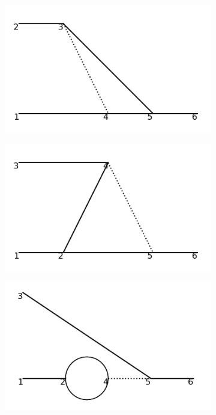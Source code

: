 \documentclass[11pt,a4paper,twoside,pdf]{article}
\numberwithin{equation}{section}
\begin{document}
\begin{figure}[h!]
\begin{subfigure}[t]{0.24\textwidth}
        \caption{ }
        \label{fig:order3_1to2/5}
    \end{subfigure}
    \hfill  
    \begin{subfigure}[t]{0.24\textwidth}
        \centering
        \includegraphics[width=\textwidth]{plots/order3/order3_1to2/6.png}
        \caption{ }
        \label{fig:order3_1to2/6}
    \end{subfigure}
    \hfill
    \begin{subfigure}[t]{0.24\textwidth}
        \centering
        \includegraphics[width=\textwidth]{plots/order3/order3_1to2/7.png}
        \caption{ }
    \end{subfigure}
    \hfill 
    \begin{subfigure}[t]{0.24\textwidth}
        \centering
        \includegraphics[width=\textwidth]{plots/order3/order3_1to2/8.png}

\end{subfigure}
\end{figure}
\end{document}
